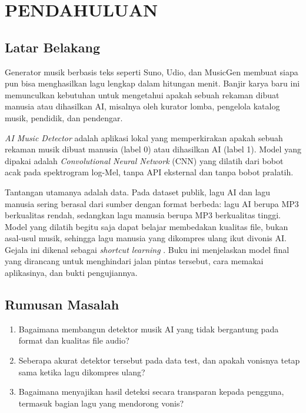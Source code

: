 \chapter{PENDAHULUAN}

\section{Latar Belakang}

Generator musik berbasis teks seperti Suno, Udio, dan MusicGen membuat siapa pun bisa menghasilkan lagu lengkap dalam hitungan menit. Banjir karya baru ini memunculkan kebutuhan untuk mengetahui apakah sebuah rekaman dibuat manusia atau dihasilkan AI, misalnya oleh kurator lomba, pengelola katalog musik, pendidik, dan pendengar.

\textit{AI Music Detector} adalah aplikasi lokal yang memperkirakan apakah sebuah rekaman musik dibuat manusia (label 0) atau dihasilkan AI (label 1). Model yang dipakai adalah \textit{Convolutional Neural Network} (CNN) yang dilatih dari bobot acak pada spektrogram log-Mel, tanpa API eksternal dan tanpa bobot pralatih.

Tantangan utamanya adalah data. Pada dataset publik, lagu AI dan lagu manusia sering berasal dari sumber dengan format berbeda: lagu AI berupa MP3 berkualitas rendah, sedangkan lagu manusia berupa MP3 berkualitas tinggi. Model yang dilatih begitu saja dapat belajar membedakan kualitas file, bukan asal-usul musik, sehingga lagu manusia yang dikompres ulang ikut divonis AI. Gejala ini dikenal sebagai \textit{shortcut learning} \cite{geirhos2020shortcut}. Buku ini menjelaskan model final  yang dirancang untuk menghindari jalan pintas tersebut, cara memakai aplikasinya, dan bukti pengujiannya.

\section{Rumusan Masalah}
\begin{enumerate}
\item Bagaimana membangun detektor musik AI yang tidak bergantung pada format dan kualitas file audio?
\item Seberapa akurat detektor tersebut pada data test, dan apakah vonisnya tetap sama ketika lagu dikompres ulang?
\item Bagaimana menyajikan hasil deteksi secara transparan kepada pengguna, termasuk bagian lagu yang mendorong vonis?
\end{enumerate}

